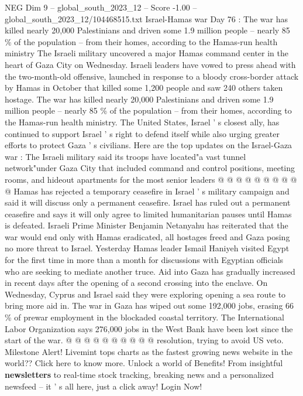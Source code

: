 \begin{textsample}{NEG Dim 9 – global\_south\_2023\_12 – Score -1.00 – global\_south\_2023\_12/104468515.txt}  \label{ex:f9_neg_441}
Israel-Hamas war Day 76 : The war has killed nearly 20,000 Palestinians and driven some 1.9 million people -- nearly 85 \% of the population -- from their homes, according to the Hamas-run health ministry The Israeli military uncovered a major Hamas command center in the heart of Gaza City on Wednesday.
Israeli leaders have vowed to press ahead with the two-month-old offensive, launched in response to a bloody cross-border attack by Hamas in October that killed some 1,200 people and saw 240 others taken hostage.
The war has killed nearly 20,000 Palestinians and driven some 1.9 million people -- nearly 85 \% of the population -- from their homes, according to the Hamas-run health ministry.
The United States, Israel ' s closest ally, has continued to support Israel ' s right to defend itself while also urging greater efforts to protect Gaza ' s civilians.
Here are the top updates on the Israel-Gaza war : The Israeli military said its troops have located"a vast tunnel network"under Gaza City that included command and control positions, meeting rooms, and hideout apartments for the most senior leaders @ @ @ @ @ @ @ @ @ @ Hamas has rejected a temporary ceasefire in Israel ' s military campaign and said it will discuss only a permanent ceasefire.
Israel has ruled out a permanent ceasefire and says it will only agree to limited humanitarian pauses until Hamas is defeated.
Israeli Prime Minister Benjamin Netanyahu has reiterated that the war would end only with Hamas eradicated, all hostages freed and Gaza posing no more threat to Israel.
Yesterday Hamas leader Ismail Haniyeh visited Egypt for the first time in more than a month for discussions with Egyptian officials who are seeking to mediate another truce.
Aid into Gaza has gradually increased in recent days after the opening of a second crossing into the enclave.
On Wednesday, Cyprus and Israel said they were exploring opening a sea route to bring more aid in.
The war in Gaza has wiped out some 192,000 jobs, erasing 66 \% of prewar employment in the blockaded coastal territory.
The International Labor Organization says 276,000 jobs in the West Bank have been lost since the start of the war. @ @ @ @ @ @ @ @ @ @ resolution, trying to avoid US veto.
Milestone Alert!
Livemint tops charts as the fastest growing news website in the world??
Click here to know more.
Unlock a world of Benefits!
From insightful \textbf{newsletters} to real-time stock tracking, breaking news and a personalized newsfeed -- it ' s all here, just a click away!
Login Now!

\end{textsample}
